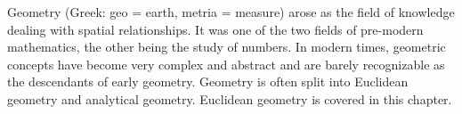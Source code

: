       
      \label{m39354*id62184}Geometry (Greek: geo = earth, metria = measure) arose as the field of knowledge dealing with spatial relationships. It was one of the two fields of pre-modern mathematics, the other being the study of numbers. In modern times, geometric concepts have become very complex and abstract and are barely recognizable as the descendants of early geometry. Geometry is often split into Euclidean geometry and analytical geometry. Euclidean geometry is covered in this chapter.\par 
%             
%         
%       

